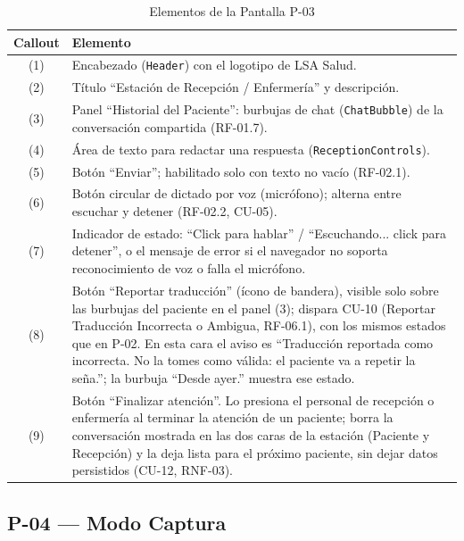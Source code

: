 \begin{table}[H]
    \centering
    \caption{Elementos de la Pantalla P-03}
    \label{tab:mock-p03}
    \begin{tabularx}{\textwidth}{c X}
        \toprule
        \textbf{Callout} & \textbf{Elemento} \\
        \midrule
        (1) & Encabezado (\texttt{Header}) con el logotipo de LSA Salud. \\
        (2) & Título ``Estación de Recepción / Enfermería'' y descripción. \\
        (3) & Panel ``Historial del Paciente'': burbujas de chat
        (\texttt{ChatBubble}) de la conversación compartida (RF-01.7). \\
        (4) & Área de texto para redactar una respuesta
        (\texttt{ReceptionControls}). \\
        (5) & Botón ``Enviar''; habilitado solo con texto no vacío (RF-02.1). \\
        (6) & Botón circular de dictado por voz (micrófono); alterna entre
        escuchar y detener (RF-02.2, CU-05). \\
        (7) & Indicador de estado: ``Click para hablar'' / ``Escuchando...
        click para detener'', o el mensaje de error si el navegador no
        soporta reconocimiento de voz o falla el micrófono. \\
        (8) & Botón ``Reportar traducción'' (ícono de bandera), visible
        solo sobre las burbujas del paciente en el panel (3); dispara CU-10
        (Reportar Traducción Incorrecta o Ambigua, RF-06.1), con los mismos
        estados que en P-02. En esta cara el aviso es ``Traducción
        reportada como incorrecta. No la tomes como válida: el paciente va
        a repetir la seña.''; la burbuja ``Desde ayer.'' muestra ese
        estado. \\
        (9) & Botón ``Finalizar atención''. Lo presiona el personal de
        recepción o enfermería al terminar la atención de un paciente;
        borra la conversación mostrada en las dos caras de la estación
        (Paciente y Recepción) y la deja lista para el próximo paciente,
        sin dejar datos persistidos (CU-12, RNF-03). \\
        \bottomrule
    \end{tabularx}
\end{table}

\subsection{P-04 --- Modo Captura}

